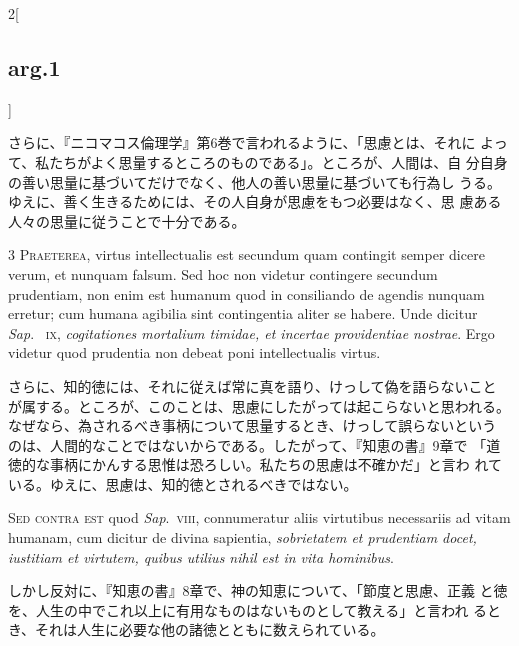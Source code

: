 \documentclass[paper=a4paper,fontsize=10pt,jafontsize=9pt,titlepage]{jlreq}
\begin{document}
\begin{paracol}{2}[\subsection{arg.1}]
\switchcolumn

さらに、『ニコマコス倫理学』第6巻で言われるように、「思慮とは、それに
よって、私たちがよく思量するところのものである」。ところが、人間は、自
分自身の善い思量に基づいてだけでなく、他人の善い思量に基づいても行為し
うる。ゆえに、善く生きるためには、その人自身が思慮をもつ必要はなく、思
慮ある人々の思量に従うことで十分である。


{\scshape 3 Praeterea}, virtus intellectualis est secundum quam
contingit semper dicere verum, et nunquam falsum. Sed hoc non videtur
contingere secundum prudentiam, non enim est humanum quod in
consiliando de agendis nunquam erretur; cum humana agibilia sint
contingentia aliter se habere. Unde dicitur {\itshape Sap}.~{\scshape
ix}, {\itshape cogitationes mortalium timidae, et incertae
providentiae nostrae}. Ergo videtur quod prudentia non debeat poni
intellectualis virtus.

\switchcolumn

さらに、知的徳には、それに従えば常に真を語り、けっして偽を語らないこと
が属する。ところが、このことは、思慮にしたがっては起こらないと思われる。
なぜなら、為されるべき事柄について思量するとき、けっして誤らないという
のは、人間的なことではないからである。したがって、『知恵の書』9章で
「道徳的な事柄にかんする思惟は恐ろしい。私たちの思慮は不確かだ」と言わ
れている。ゆえに、思慮は、知的徳とされるべきではない。

\switchcolumn*[\subsection{s.c.}]

{\scshape Sed contra est} quod {\itshape Sap}.~{\scshape viii},
connumeratur aliis virtutibus necessariis ad vitam humanam, cum
dicitur de divina sapientia, {\itshape sobrietatem et prudentiam
docet, iustitiam et virtutem, quibus utilius nihil est in vita
hominibus}.

\switchcolumn

しかし反対に、『知恵の書』8章で、神の知恵について、「節度と思慮、正義
と徳を、人生の中でこれ以上に有用なものはないものとして教える」と言われ
るとき、それは人生に必要な他の諸徳とともに数えられている。



\end{paracol}
\end{document}
